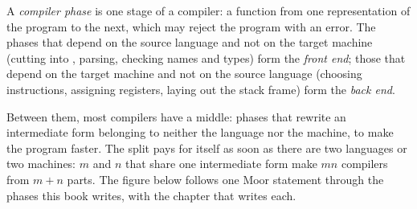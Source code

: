 \begin{definition}\label{def:b3:lexical-analysis:phases}
A \emph{compiler phase} is one stage of a compiler: a function from one representation of the program to the next, which may reject the program with an error. The phases that depend on the source language and not on the target machine (cutting into , parsing, checking names and types) form the \emph{front end}; those that depend on the target machine and not on the source language (choosing instructions, assigning registers, laying out the stack frame) form the \emph{back end}.
\end{definition}

Between them, most compilers have a middle: phases that rewrite an intermediate form belonging to neither the language nor the machine, to make the program faster. The split pays for itself as soon as there are two languages or two machines: $m$  and $n$  that share one intermediate form make $m n$ compilers from $m + n$ parts. The figure below follows one Moor statement through the phases this book writes, with the chapter that writes each.

